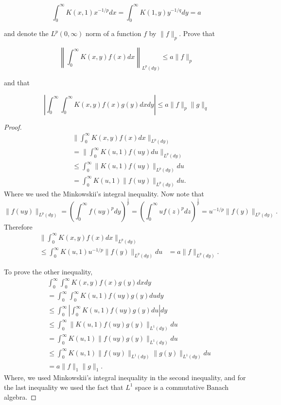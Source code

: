 \begin{enumerate}
\[
\int_0^{\infty} K(x, 1) x^{-1 / p} d x=\int_0^{\infty} K(1, y) y^{-1 / q} d y=a
\]

and denote the $L^p(0, \infty)$ norm of a function $f$ by $\|f\|_p$. Prove that

\[
\left\|\int_0^{\infty} K(x, y) f(x) d x\right\|_{L^p(d y)} \leq a\|f\|_p
\]

and that

\[
\left|\int_0^{\infty} \int_0^{\infty} K(x, y) f(x) g(y) d x d y\right| \leq a\|f\|_p\|g\|_q
\]
\begin{proof}
	\begin{align*}
		& \| \int _0^\infty  K(x, y) f(x) d x \|_{L^p(dy)} \\
		&= \| \int _0^\infty  K(u,1) f(uy) d u \|_{L^p(dy)} \\
		&\le  \int _0^\infty \|  K(u,1) f(uy) \|_{L^p(dy)} du  \\
		&=  \int _0^\infty   K(u,1) \|f(uy) \|_{L^p(dy)} du
	.\end{align*}
	Where we used the Minkowskii's integral inequality. Now note that
	\[
		\|f(uy)\|_{L^p(dy)} 
		= \left( \int _0^\infty f(uy)^p dy \right) ^{\frac{1}{p}}
		= \left( \int _0^\infty uf(z)^p dz \right) ^{\frac{1}{p}} = 
		u^{ - 1 / p}\|f(y)\|_{L^p(dy)} 
	.\] 
	Therefore
\begin{align*}
		& \| \int _0^\infty  K(x, y) f(x) d x \|_{L^p(dy)} \\
		&\le   \int _0^\infty   K(u,1) u^{ - 1 / p}\|f(y) \|_{L^p(dy)} du
		&=  a\|f\|_{L^p(dy)}
	.\end{align*}

	To prove the other inequality,
	\begin{align*}
		&\int _0^\infty  \int _0^\infty  K(x, y) f(x) g(y) dx dy\\
		&= \int _0^\infty  \int _0^\infty  K(u, 1) f(uy) g(y) du dy \\
		&\leq \int _0^\infty  \left| \int _0^\infty  K(u, 1) f(uy) g(y) du \right|  dy \\
		&\leq \int _0^\infty    \|K(u, 1) f(uy) g(y)\|_{L^1(dy)}   du \\
		&= \int _0^\infty    K(u, 1)\| f(uy) g(y)\|_{L^1(dy)}   du \\
		&\leq \int _0^\infty    K(u, 1)\| f(uy) \|_{L^1(dy)}\|g(y)\|_{L^1(dy)}   du \\
		&= a \|f\|_1 \|g\|_1
	.\end{align*}
	Where, we used Minkowskii's integral inequality in the second inequality, and for the last inequality we used the fact that $L^1$ space is a commutative Banach algebra.
\end{proof}
	

\end{enumerate}

